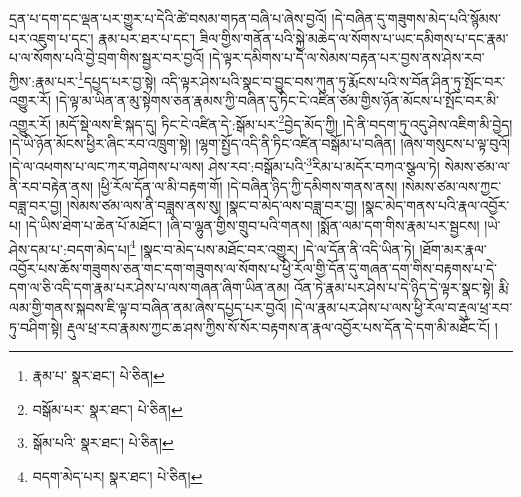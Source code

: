 དྲན་པ་དག་དང་ལྡན་པར་གྱུར་པ་དེའི་ཚེ་བསམ་གཏན་བཞི་པ་ཞེས་བྱའོ། །དེ་བཞིན་དུ་གཟུགས་མེད་པའི་སྙོམས་པར་འཇུག་པ་དང་། རྣམ་པར་ཐར་པ་དང་། ཟིལ་གྱིས་གནོན་པའི་སྐྱེ་མཆེད་ལ་སོགས་པ་ཡང་དམིགས་པ་དང་རྣམ་པ་ལ་སོགས་པའི་བྱེ་བྲག་གིས་སྦྱར་བར་བྱའོ། །དེ་ལྟར་དམིགས་པ་དེ་ལ་སེམས་བརྟན་པར་བྱས་ནས་ཤེས་རབ་ཀྱིས་:རྣམ་པར་\footnote{རྣམ་པ་  སྣར་ཐང་།  པེ་ཅིན། }དཔྱད་པར་བྱ་སྟེ། འདི་ལྟར་ཤེས་པའི་སྣང་བ་བྱུང་བས་ཀུན་ཏུ་རྨོངས་པའི་ས་བོན་ཤིན་ཏུ་སྤོང་བར་འགྱུར་རོ། །དེ་ལྟ་མ་ཡིན་ན་མུ་སྟེགས་ཅན་རྣམས་ཀྱི་བཞིན་དུ་ཏིང་ངེ་འཛིན་ཙམ་གྱིས་ཉོན་མོངས་པ་སྤོང་བར་མི་འགྱུར་རོ། །མདོ་སྡེ་ལས་ཇི་སྐད་དུ། ཏིང་ངེ་འཛིན་དེ་:སྒོམ་པར་\footnote{བསྒོམ་པར་  སྣར་ཐང་།  པེ་ཅིན། }བྱེད་མོད་ཀྱི། །དེ་ནི་བདག་ཏུ་འདུ་ཤེས་འཇིག་མི་བྱེད། །དེ་ཡི་ཉོན་མོངས་ཕྱིར་ཞིང་རབ་འཁྲུག་སྟེ། །ལྷག་སྤྱོད་འདི་ནི་ཏིང་འཛིན་བསྒོམ་པ་བཞིན། །ཞེས་གསུངས་པ་ལྟ་བུའོ། །དེ་ལ་འཕགས་པ་ལང་ཀར་གཤེགས་པ་ལས། ཤེས་རབ་:བསྒོམ་པའི་\footnote{སྒོམ་པའི་  སྣར་ཐང་།  པེ་ཅིན། }རིམ་པ་མདོར་བཀའ་སྩལ་ཏེ། སེམས་ཙམ་ལ་ནི་རབ་བརྟེན་ནས། །ཕྱི་རོལ་དོན་ལ་མི་བརྟག་གོ། །དེ་བཞིན་ཉིད་ཀྱི་དམིགས་གནས་ནས། །སེམས་ཙམ་ལས་ཀྱང་བཟླ་བར་བྱ། །སེམས་ཙམ་ལས་ནི་བཟླས་ནས་སུ། །སྣང་བ་མེད་ལས་བཟླ་བར་བྱ། །སྣང་མེད་གནས་པའི་རྣལ་འབྱོར་པ། །དེ་ཡིས་ཐེག་པ་ཆེན་པོ་མཐོང་། །ཞི་བ་ལྷུན་གྱིས་གྲུབ་པའི་གནས། །སྨོན་ལམ་དག་གིས་རྣམ་པར་སྦྱངས། །ཡེ་ཤེས་དམ་པ་:བདག་མེད་པ།\footnote{བདག་མེད་པར།  སྣར་ཐང་།  པེ་ཅིན། } །སྣང་བ་མེད་པས་མཐོང་བར་འགྱུར། །དེ་ལ་དོན་ནི་འདི་ཡིན་ཏེ། །ཐོག་མར་རྣལ་འབྱོར་པས་ཆོས་གཟུགས་ཅན་གང་དག་གཟུགས་ལ་སོགས་པ་ཕྱི་རོལ་གྱི་དོན་དུ་གཞན་དག་གིས་བརྟགས་པ་དེ་དག་ལ་ཅི་འདི་དག་རྣམ་པར་ཤེས་པ་ལས་གཞན་ཞིག་ཡིན་ནམ། འོན་ཏེ་རྣམ་པར་ཤེས་པ་དེ་ཉིད་དེ་ལྟར་སྣང་སྟེ། རྨི་ལམ་གྱི་གནས་སྐབས་ཇི་ལྟ་བ་བཞིན་ནམ་ཞེས་དཔྱད་པར་བྱའོ། །དེ་ལ་རྣམ་པར་ཤེས་པ་ལས་ཕྱི་རོལ་བ་རྡུལ་ཕྲ་རབ་ཏུ་བཤིག་སྟེ། རྡུལ་ཕྲ་རབ་རྣམས་ཀྱང་ཆ་ཤས་ཀྱིས་སོ་སོར་བརྟགས་ན་རྣལ་འབྱོར་པས་དོན་དེ་དག་མི་མཐོང་ངོ། །
